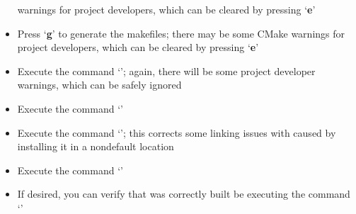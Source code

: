 \begin{itemize}
warnings for project developers, which can be cleared by pressing `\textbf{e}'
\item\exSp{} Press `\textbf{g}' to generate the makefiles; there may be some CMake
warnings for project developers, which can be cleared by pressing `\textbf{e}'
\item\exSp{} Execute the command `'; again, there will be some project
developer warnings, which can be safely ignored
\item\exSp{} Execute the command `'
\item\exSp{} Execute the command `'; this corrects some
linking issues with \yarp{} caused by installing it in a non\longDash{}default location
\item\exSp{} Execute the command `'
\item\exSp{} If desired, you can verify that \yarp{} was correctly built be executing the
command `'
\end{itemize}
\tertiaryEnd{}
